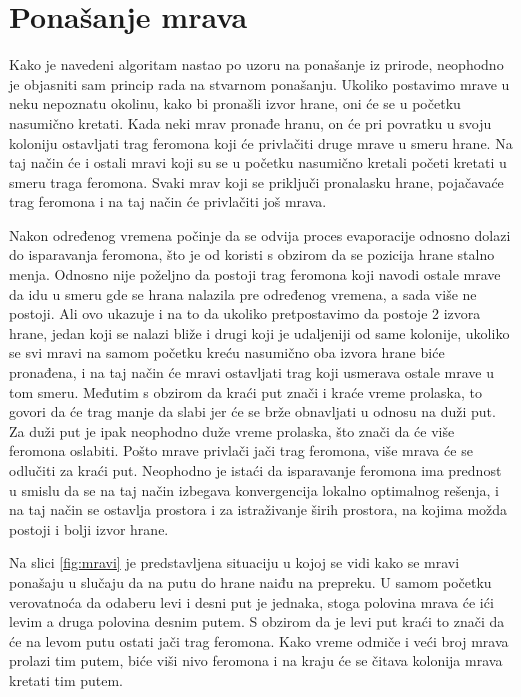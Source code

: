 \documentclass[a4paper]{article}
\begin{document}
\section{Ponašanje mrava}
\label{sec:ponasanjemrava}

Kako je navedeni algoritam nastao po uzoru na ponašanje iz prirode, neophodno je objasniti sam princip rada na stvarnom ponašanju. Ukoliko postavimo mrave u neku nepoznatu okolinu, kako bi pronašli izvor hrane, oni će se u početku nasumično kretati. Kada neki mrav pronađe hranu, on će pri povratku u svoju koloniju ostavljati trag feromona koji će privlačiti druge mrave u smeru hrane. Na taj način će i ostali mravi koji su se u početku nasumično kretali početi kretati u smeru traga feromona. Svaki mrav koji se priključi pronalasku hrane, pojačavaće trag feromona i na taj način će privlačiti još mrava. 

\vspace{3mm}

Nakon određenog vremena počinje da se odvija proces evaporacije odnosno dolazi do isparavanja feromona, što je od koristi s obzirom da se pozicija hrane stalno menja. Odnosno nije poželjno da postoji trag feromona koji navodi ostale mrave da idu u smeru gde se hrana nalazila pre određenog vremena, a sada više ne postoji. Ali ovo ukazuje i na to da ukoliko pretpostavimo da postoje 2 izvora hrane, jedan koji se nalazi bliže i drugi koji je udaljeniji od same kolonije, ukoliko se svi mravi na samom početku kreću nasumično oba izvora hrane biće pronađena, i na taj način će mravi ostavljati trag koji usmerava ostale mrave u tom smeru. Međutim s obzirom da kraći put znači i kraće vreme prolaska, to govori da će trag manje da slabi jer će se brže obnavljati u odnosu na duži put. Za duži put je ipak neophodno duže vreme prolaska, što znači da će više feromona oslabiti. Pošto mrave privlači jači trag feromona, više mrava će se odlučiti za kraći put. Neophodno je istaći da isparavanje feromona ima prednost u smislu da se na taj način izbegava konvergencija lokalno optimalnog rešenja, i na taj način se ostavlja prostora i za istraživanje širih prostora, na kojima možda postoji i bolji izvor hrane.

\vspace{3mm}

Na slici \ref{fig:mravi} je predstavljena situaciju u kojoj se vidi kako se mravi ponašaju u slučaju da na putu do hrane naiđu na prepreku. U samom početku verovatnoća da odaberu levi i desni put je jednaka, stoga polovina mrava će ići levim a druga polovina desnim putem. S obzirom da je levi put kraći to znači da će na levom putu ostati jači trag feromona. Kako vreme odmiče i veći broj mrava prolazi tim putem, biće viši nivo feromona i na kraju će se čitava kolonija mrava kretati tim putem.
\end{document}
